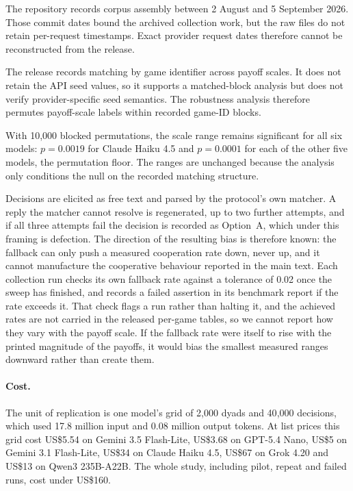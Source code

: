 \documentclass[11pt,a4paper]{article}
\newcommand{\rev}[1]{{\color{red}#1}}
\newcommand{\rev}[1]{#1}
\begin{document}
The repository records corpus assembly between 2 August and 5 September 2026. Those commit dates bound the archived collection work, but the raw files do not retain per-request timestamps. Exact provider request dates therefore cannot be reconstructed from the release.

The release records matching by game identifier across payoff scales. It does not retain the API seed values, so it supports a matched-block analysis but does not verify provider-specific seed semantics. The robustness analysis therefore permutes payoff-scale labels within recorded game-ID blocks.

With 10,000 blocked permutations, the scale range remains significant for all six models: $p=0.0019$ for Claude Haiku 4.5 and $p=0.0001$ for each of the other five models, the permutation floor. The ranges are unchanged because the analysis only conditions the null on the recorded matching structure.

Decisions are elicited as free text and parsed by the protocol's own matcher. A reply the matcher cannot resolve is regenerated, up to two further attempts, and if all three attempts fail the decision is recorded as Option~A, which under this framing is defection. The direction of the resulting bias is therefore known: the fallback can only push a measured cooperation rate down, never up, and it cannot manufacture the cooperative behaviour reported in the main text. Each collection run checks its own fallback rate against a tolerance of 0.02 once the sweep has finished, and records a failed assertion in its benchmark report if the rate exceeds it. That check flags a run rather than halting it, and the achieved rates are not carried in the released per-game tables, so we cannot report how they vary with the payoff scale. If the fallback rate were itself to rise with the printed magnitude of the payoffs, it would bias the smallest measured ranges downward rather than create them.

\rev{\paragraph{Cost.} The unit of replication is one model's grid of 2{,}000 dyads and 40{,}000 decisions, which used 17.8 million input and 0.08 million output tokens. At list prices this grid cost US\$5.54 on Gemini 3.5 Flash-Lite, US\$3.68 on GPT-5.4 Nano, US\$5 on Gemini 3.1 Flash-Lite,  US\$34 on Claude Haiku 4.5, US\$67 on Grok 4.20 and US\$13 on Qwen3 235B-A22B. The whole study, including pilot, repeat and failed runs, cost under US\$160.}
\end{document}
